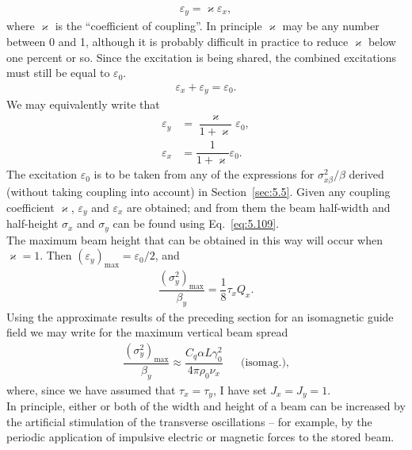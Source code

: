 \begin{align}
	\varepsilon_y = \varkappa \varepsilon_x,
\end{align}
where $\varkappa$ is the ``coefficient of coupling''. In principle $\varkappa$ may be any number between
0 and 1, although it is probably difficult in practice to reduce $\varkappa$ below one percent or so. Since the excitation is being shared, the combined excitations must still be equal to $\varepsilon_0$.
\begin{align}
	\varepsilon_x + \varepsilon_y = \varepsilon_0.
\end{align}
We may equivalently write that
\begin{align}
	\varepsilon_y &= \dfrac{\varkappa}{1+\varkappa}\varepsilon_0,\\
    \varepsilon_x &= \dfrac{1}{1+\varkappa}\varepsilon_0.
\end{align}
The excitation $\varepsilon_0$ is to be taken from any of the expressions for $\sigma_{x\beta}^2/\beta$ derived (without taking coupling into account) in Section~\ref{sec:5.5}. Given any coupling coefficient $\varkappa$, $\varepsilon_y$ and $\varepsilon_x$ are obtained; and from them the beam half-width and half-height $\sigma_x$ and $\sigma_y$ can be found using Eq.~\eqref{eq:5.109}.\\
The maximum beam height that can be obtained in this way will occur when $\varkappa = 1$. Then $(\varepsilon_y)_\text{max} = \varepsilon_0/2$, and
\begin{align}
	\dfrac{(\sigma_y^2)_\text{max}}{\beta_y} = \dfrac{1}{8} \tau_x Q_x.
\end{align}
Using the approximate results of the preceding section for an isomagnetic guide field we may write for the maximum vertical beam spread
\begin{align}
	\dfrac{(\sigma_y^2)_\text{max}}{\beta_y} \approx \dfrac{C_q \alpha L \gamma_0^2}{4\pi\rho_0\nu_x} && \text{(isomag.)},
\end{align}
where, since we have assumed that $\tau_x = \tau_y$, I have set $J_x = J_y = 1$.\\
In principle, either or both of the width and height of a beam can be increased by the artificial stimulation of the transverse oscillations -- for example, by the periodic application of impulsive electric or magnetic forces to the stored beam.
